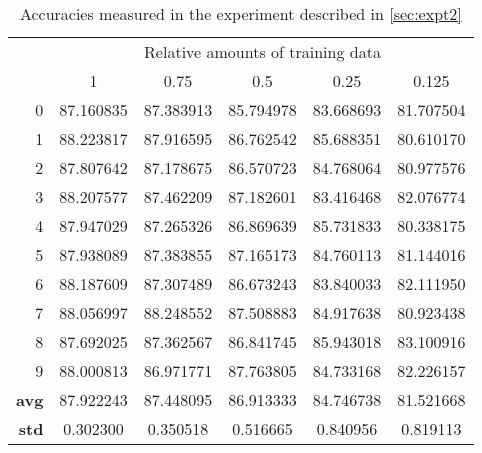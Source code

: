 \begin{table}[h]
\begin{tabular}{r||c|c|c|c|c}
\toprule
& \multicolumn{5}{c}{Relative amounts of training data} \\
&          1 &       0.75 &        0.5 &       0.25 &      0.125 \\
\midrule
0   &  87.160835 &  87.383913 &  85.794978 &  83.668693 &  81.707504 \\
1   &  88.223817 &  87.916595 &  86.762542 &  85.688351 &  80.610170 \\
2   &  87.807642 &  87.178675 &  86.570723 &  84.768064 &  80.977576 \\
3   &  88.207577 &  87.462209 &  87.182601 &  83.416468 &  82.076774 \\
4   &  87.947029 &  87.265326 &  86.869639 &  85.731833 &  80.338175 \\
\midrule
5   &  87.938089 &  87.383855 &  87.165173 &  84.760113 &  81.144016 \\
6   &  88.187609 &  87.307489 &  86.673243 &  83.840033 &  82.111950 \\
7   &  88.056997 &  88.248552 &  87.508883 &  84.917638 &  80.923438 \\
8   &  87.692025 &  87.362567 &  86.841745 &  85.943018 &  83.100916 \\
9   &  88.000813 &  86.971771 &  87.763805 &  84.733168 &  82.226157 \\
\hline
\textbf{avg} &  87.922243 &  87.448095 &  86.913333 &  84.746738 &  81.521668 \\
\hline
\textbf{std} &   0.302300 &   0.350518 &   0.516665 &   0.840956 &   0.819113 \\
\bottomrule
\end{tabular}

\caption[All measured accuracies using semi-supervised ULMFiT]{Accuracies measured in the experiment described in \cref{sec:expt2}}
\end{table}

